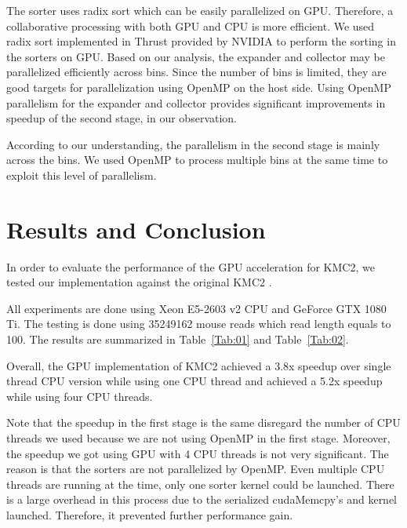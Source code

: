 \documentclass{bioinfo}
\begin{document}
The sorter uses radix sort which can be easily parallelized on GPU.
Therefore, a collaborative processing with both GPU and CPU is more efficient.
We used radix sort implemented in Thrust \citep{Jared} provided by NVIDIA to perform the 
sorting in the sorters on GPU.
Based on our analysis, the expander and collector may be parallelized efficiently across bins.
Since the number of bins is limited, they are good targets for parallelization using OpenMP on 
the host side. Using OpenMP parallelism for the expander and collector provides significant 
improvements in speedup of the second stage, in our observation.

According to our understanding, the parallelism in the second stage is mainly across the bins.
We used OpenMP to process multiple bins at the same time to exploit this level of parallelism.


\section{Results and Conclusion}
In order to evaluate the performance of the GPU acceleration for KMC2, we tested our
implementation against the original KMC2 \citep{Seb14}.

All experiments are done using Xeon E5-2603 v2 CPU and GeForce GTX 1080 Ti.
The testing is done using 35249162 mouse reads which read length equals to 100.
The results are summarized in Table~\ref{Tab:01} and Table~\ref{Tab:02}.

Overall, the GPU implementation of KMC2 achieved a 3.8x speedup over single thread CPU
version while using one CPU thread and achieved a 5.2x speedup while using four CPU
threads.

Note that the speedup in the first stage is the same disregard the number of CPU
threads we used because we are not using OpenMP in the first stage.
Moreover, the speedup we got using GPU with 4 CPU threads is not very significant.
The reason is that the sorters are not parallelized by OpenMP. Even multiple CPU threads
are running at the time, only one sorter kernel could be launched.
There is a large overhead in this process due to the serialized cudaMemcpy's and kernel
launched. Therefore, it prevented further performance gain.
\end{document}
